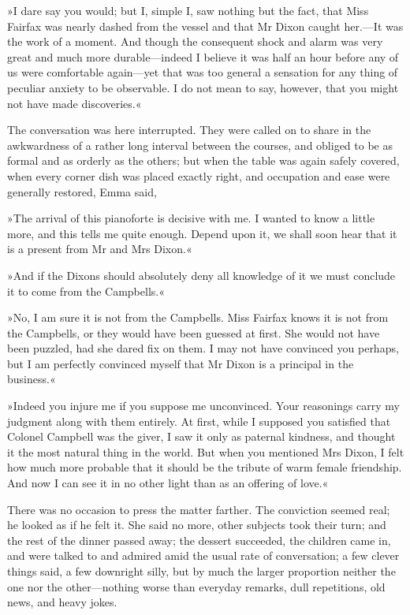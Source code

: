 »I dare say you would; but I, simple I, saw nothing but the fact, that Miss Fairfax was nearly dashed from the vessel and that Mr Dixon caught her.—It was the work of a moment. And though the consequent shock and alarm was very great and much more durable—indeed I believe it was half an hour before any of us were comfortable again—yet that was too general a sensation for any thing of peculiar anxiety to be observable. I do not mean to say, however, that you might not have made discoveries.«

The conversation was here interrupted. They were called on to share in the awkwardness of a rather long interval between the courses, and obliged to be as formal and as orderly as the others; but when the table was again safely covered, when every corner dish was placed exactly right, and occupation and ease were generally restored, Emma said,

»The arrival of this pianoforte is decisive with me. I wanted to know a little more, and this tells me quite enough. Depend upon it, we shall soon hear that it is a present from Mr and Mrs Dixon.«

»And if the Dixons should absolutely deny all knowledge of it we must conclude it to come from the Campbells.«

»No, I am sure it is not from the Campbells. Miss Fairfax knows it is not from the Campbells, or they would have been guessed at first. She would not have been puzzled, had she dared fix on them. I may not have convinced you perhaps, but I am perfectly convinced myself that Mr Dixon is a principal in the business.«

»Indeed you injure me if you suppose me unconvinced. Your reasonings carry my judgment along with them entirely. At first, while I supposed you satisfied that Colonel Campbell was the giver, I saw it only as paternal kindness, and thought it the most natural thing in the world. But when you mentioned Mrs Dixon, I felt how much more probable that it should be the tribute of warm female friendship. And now I can see it in no other light than as an offering of love.«

There was no occasion to press the matter farther. The conviction seemed real; he looked as if he felt it. She said no more, other subjects took their turn; and the rest of the dinner passed away; the dessert succeeded, the children came in, and were talked to and admired amid the usual rate of conversation; a few clever things said, a few downright silly, but by much the larger proportion neither the one nor the other—nothing worse than everyday remarks, dull repetitions, old news, and heavy jokes.

